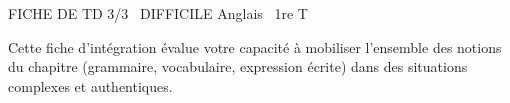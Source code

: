 \documentclass[11pt]{article}
\begin{document}
\begin{tcolorbox}[enhanced,colback=popink,colframe=popink,arc=10pt,boxrule=0pt,left=12pt,right=12pt,top=9pt,bottom=9pt]
{\color{white}\popxbold\small FICHE DE TD 3/3 \textbullet\ DIFFICILE \hfill Anglais \textbullet\ 1re T\par}
\end{tcolorbox}
\vspace{4pt}
Cette fiche d'intégration évalue votre capacité à mobiliser l'ensemble des notions du chapitre (grammaire, vocabulaire, expression écrite) dans des situations complexes et authentiques.
\end{document}
